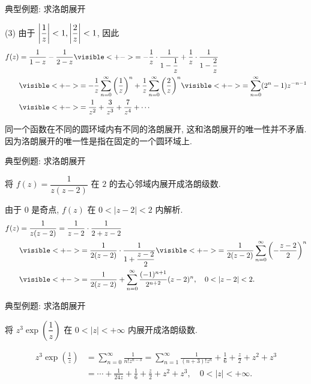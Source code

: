 \begin{frame}{典型例题: 求洛朗展开}
\begin{solutionc}
(3) 由于 $\left|\dfrac1z\right|<1,\left|\dfrac2z\right|<1$, \onslide<+->
因此
\begin{align*}
f(z)&=\frac1{1-z}-\frac1{2-z}
	\visible<+->{=-\frac1z\cdot\frac1{1-\dfrac1z}+\frac1z\cdot\frac1{1-\dfrac2z}}\\
&\visible<+->{=-\frac1z\sum_{n=0}^\infty \left(\frac1z\right)^n+\frac1z\sum_{n=0}^\infty\left(\frac2z\right)^n}
	\visible<+->{=\sum_{n=0}^\infty(2^n-1)z^{-n-1}}\\
&\visible<+->{=\frac1{z^2}+\frac3{z^3}+\frac7{z^4}+\cdots}
\end{align*}
\end{solutionc}
\onslide<+->
同一个函数在不同的圆环域内有不同的洛朗展开, 这和洛朗展开的唯一性并不矛盾.
\onslide<+->
因为洛朗展开的唯一性是指在固定的一个圆环域上.
\end{frame}


\begin{frame}{典型例题: 求洛朗展开}
\begin{example}
将 $f(z)=\dfrac1{z(z-2)}$ 在 $2$ 的去心邻域内展开成洛朗级数.
\end{example}
\begin{solution}
由于 $0$ 是奇点, $f(z)$ 在 $0<|z-2|<2$ 内解析.
\onslide<+->
\begin{align*}
f(z)&=\frac1{z(z-2)}=\frac1{z-2}\cdot\frac1{2+z-2}\\
&\visible<+->{=\frac1{2(z-2)}\cdot\frac1{1+\dfrac{z-2}2}}
	\visible<+->{=\frac1{2(z-2)}\sum_{n=0}^\infty\left(-\frac{z-2}2\right)^n}\\
&\visible<+->{=\frac1{2(z-2)}+\sum_{n=0}^\infty\frac{(-1)^{n+1}}{2^{n+2}}(z-2)^n,\quad 0<|z-2|<2.}
\end{align*}
\vspace{-5pt}
\end{solution}
\end{frame}


\begin{frame}{典型例题: 求洛朗展开}
\begin{exercise}
将 $z^3\exp\left(\dfrac1z\right)$ 在 $0<|z|<+\infty$ 内展开成洛朗级数.
\end{exercise}
\begin{answer}
\vspace{-\baselineskip}
\begin{align*}
z^3\exp\left(\frac1z\right)&=\sum_{n=0}^\infty\frac{1}{n!z^{n-3}}
=\sum_{n=1}^\infty\frac1{(n+3)! z^n}+\frac16+\frac z2+z^2+z^3\\
&=\cdots+\frac1{24z}+\frac16+\frac z2+z^2+z^3,\quad 0<|z|<+\infty.
\end{align*}
\end{answer}
\end{frame}


